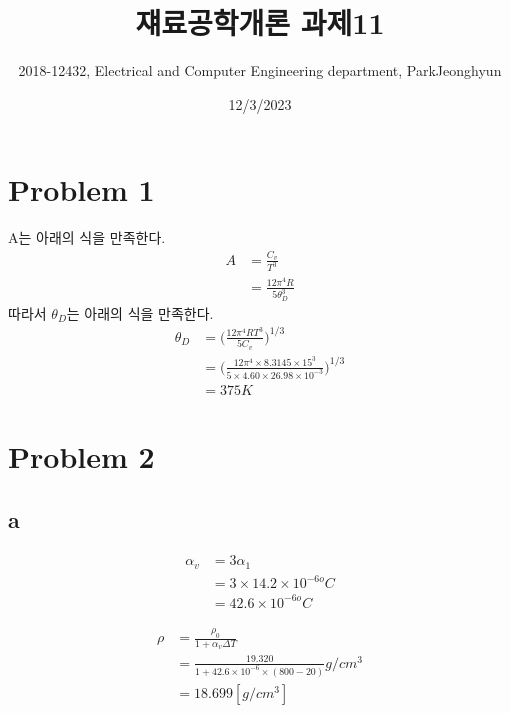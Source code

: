 \documentclass[a4paper]{oblivoir}
\title{쟤료공학개론 과제11}
\author{2018-12432, Electrical and Computer Engineering department, ParkJeonghyun}
\date{12/3/2023}
\begin{document}
\maketitle
\section{Problem 1}
A는 아래의 식을 만족한다.
\begin{align}
	A &= \frac{C_{v}}{T^{3}}\\
	&= \frac{12\pi^{4}R}{5\theta_{D}^{3}}
\end{align}
따라서 $\theta_{D}$는 아래의 식을 만족한다.
\begin{align}
	\theta_{D} &= \Bigg(\frac{12\pi^{4}RT^{3}}{5C_{v}}\Bigg)^{1/3}\\
	&= \Bigg(\frac{12\pi^{4}\times 8.3145 \times 15^{3}}{5\times 4.60\times 26.98\times 10^{-3}}\Bigg)^{1/3}\\
	&= 375 K
\end{align}

\section{Problem 2}
\subsection{a}
\begin{align}
	\alpha_{v} &= 3\alpha_{1}\\
	&= 3 \times 14.2 \times 10^{-6 o}C\\
	&= 42.6 \times 10^{-6 o}C
\end{align}

\begin{align}
	\rho &= \frac{\rho_{0}}{1+\alpha_{v}\Delta T}\\
	&= \frac{19.320}{1+42.6 \times 10^{-6} \times (800-20)}g/cm^{3}\\
	&= 18.699 [g/cm^{3}]
\end{align}
\end{document}
